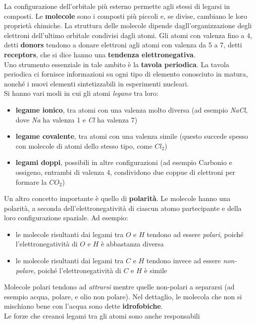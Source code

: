 \documentclass[a4paper,12pt, oneside]{book}
\begin{document}
La configurazione dell'orbitale più esterno permette agli stessi di legarsi in
composti. Le \textbf{molecole} sono i composti più piccoli e, se divise,
cambiano le loro proprietà chimiche. La struttura delle molecole dipende
dagll'organizzazione degli elettroni dell'ultimo orbitale condivisi dagli atomi.
Gli atomi con valenza fino a 4, detti \textbf{donors} tendono a donare
elettroni agli atomi con valenza da 5 a 7, detti \textbf{receptors}, che si dice
hanno una \textbf{tendenza elettronegativa}. \\
Uno strumento essenziale in tale ambito è la \textbf{tavola periodica}. La
tavola periodica ci fornisce informazioni su ogni tipo di elemento conosciuto in
matura, nonché i nuovi elementi sintetizzabili in esperimenti nucleari.\\
Si hanno vari modi in cui gli atomi \textit{legano} tra loro:
\begin{itemize}
  \item \textbf{legame ionico}, tra atomi con una valenza molto diversa (ad
  esempio \textit{NaCl}, dove \textit{Na} ha valenza 1 e \textit{Cl} ha valenza
  7)
  \item \textbf{legame covalente}, tra atomi con una valenza simile (questo
  succede spesso con molecole di atomi dello stesso tipo, come $Cl_2$)
  \item \textbf{legami doppi}, possibili in altre configurazioni (ad esempio
  Carbonio e ossigeno, entrambi di valenza 4, condividono due coppue di
  elettroni per formare la $CO_2$)
\end{itemize}
Un altro concetto importante è quello di \textbf{polarità}. Le molecole hanno
una polarità, a seconda dell'elettronegatività di ciascun atomo partecipante e
della loro configurazione spaziale. Ad esempio:
\begin{itemize}
  \item le molecole risultanti dai legami tra $O$ e $H$ tendono ad essere
  \textit{polari}, poiché l'elettronegatività di $O$ e $H$ è abbastanza diversa 
  \item le molecole risultanti dai legami tra $C$ e $H$ tendono invece ad essere
  \textit{non- polare}, poiché l'elettronegatività di $C$ e $H$ è simile 
\end{itemize}
Molecole polari tendono ad \textit{attrarsi} mentre quelle non-polari a
separarsi (ad esempio acqua, polare, e olio non polare). Nel dettaglio, le
molecola che non si mischiano bene con l'acqua sono dette
\textbf{idrofobiche}.\\
Le forze che creanoi legami tra gli atomi sono anche responsabili
\end{document}
